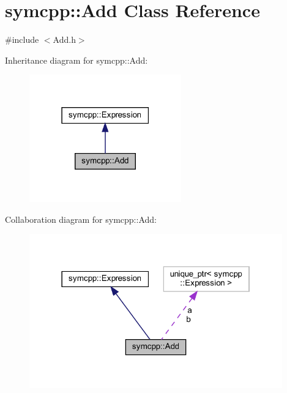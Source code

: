 \hypertarget{classsymcpp_1_1Add}{}\section{symcpp\+::Add Class Reference}
\label{classsymcpp_1_1Add}


{\ttfamily \#include $<$Add.\+h$>$}



Inheritance diagram for symcpp\+::Add\+:
\nopagebreak
\begin{figure}[H]
\begin{center}
\leavevmode
\includegraphics[width=186pt]{classsymcpp_1_1Add__inherit__graph}
\end{center}
\end{figure}


Collaboration diagram for symcpp\+::Add\+:
\nopagebreak
\begin{figure}[H]
\begin{center}
\leavevmode
\includegraphics[width=310pt]{classsymcpp_1_1Add__coll__graph}
\end{center}
\end{figure}
